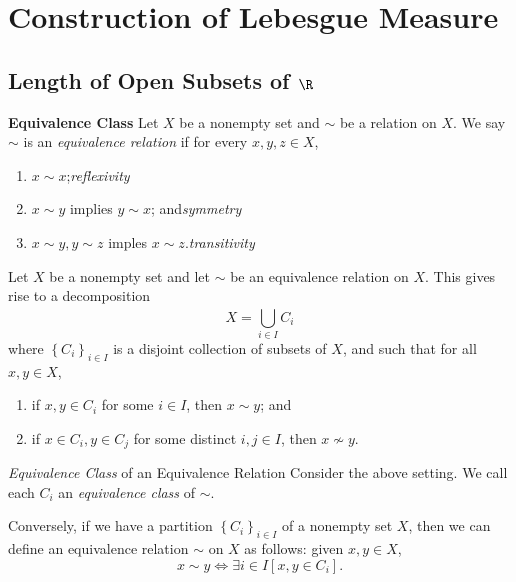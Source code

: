 \documentclass[pmath450]{subfiles}
\begin{document}
    \section{Construction of Lebesgue Measure}
    
    \subsection{Length of Open Subsets of $\R$}
    
    \begin{recall}{\textbf{Equivalence Class}}
        Let $X$ be a nonempty set and $\sim$ be a relation on $X$. We say $\sim$ is an \emph{equivalence relation} if for every $x,y,z\in X$,
        \begin{enumerate}
            \item $x\sim x$;\hfill\textit{reflexivity}
            \item $x\sim y$ implies $y\sim x$; and\hfill\textit{symmetry}
            \item $x\sim y, y\sim z$ imples $x\sim z$.\hfill\textit{transitivity}
        \end{enumerate}
    \end{recall}

    \np
    Let $X$ be a nonempty set and let $\sim$ be an equivalence relation on $X$. This gives rise to a decomposition
    \begin{equation*}
        X = \bigcup^{}_{i\in I}C_i
    \end{equation*}
    where $\left\lbrace C_i \right\rbrace^{}_{i\in I}$ is a disjoint collection of subsets of $X$, and such that for all $x,y\in X$,
    \begin{enumerate}
        \item if $x,y\in C_i$ for some $i\in I$, then $x\sim y$; and
        \item if $x\in C_i, y\in C_j$ for some distinct $i,j\in I$, then $x\nsim y$.
    \end{enumerate}

    \begin{recall}{\emph{Equivalence Class} of an Equivalence Relation}
        Consider the above setting. We call each $C_i$ an \emph{equivalence class} of $\sim$.
    \end{recall}

    \np
    Conversely, if we have a partition $\left\lbrace C_i \right\rbrace^{}_{i\in I}$ of a nonempty set $X$, then we can define an equivalence relation $\sim$ on $X$ as follows: given $x,y\in X$,
    \begin{equation}
        x\sim y \iff \exists i\in I\left[ x,y\in C_i \right].
    \end{equation}
\end{document}
